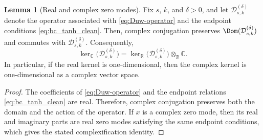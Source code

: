 \documentclass[11pt]{article}
\newcommand{\R}{\mathbb{R}}
\newcommand{\C}{\mathbb{C}}
\theoremstyle{definition}
\newtheorem{lemma}[theorem]{Lemma}
\numberwithin{equation}{section}
\begin{document}
\begin{lemma}[Real and complex zero modes]
\label{lem:real-complex-kernel}
Fix \(s\), \(k\), and \(\delta>0\), and let \(\mathcal D^{(\delta)}_{s,k}\) denote the operator associated with \eqref{eq:Duw-operator} and the endpoint conditions \eqref{eq:bc_tanh_clean}. Then, complex conjugation preserves \(\Dom(\mathcal D^{(\delta)}_{s,k})\) and commutes with \(\mathcal D^{(\delta)}_{s,k}\). Consequently,
\begin{equation}
\ker_{\C}\bigl(\mathcal D^{(\delta)}_{s,k}\bigr)
=
\ker_{\R}\bigl(\mathcal D^{(\delta)}_{s,k}\bigr)\otimes_{\R}\C.
\end{equation}
In particular, if the real kernel is one-dimensional, then the complex kernel is one-dimensional as a complex vector space.
\end{lemma}

\begin{proof}
The coefficients of \eqref{eq:Duw-operator} and the endpoint relations \eqref{eq:bc_tanh_clean} are real. Therefore, complex conjugation preserves both the domain and the action of the operator. If \(x\) is a complex zero mode, then its real and imaginary parts are real zero modes satisfying the same endpoint conditions, which gives the stated complexification identity.
\end{proof}
\end{document}
